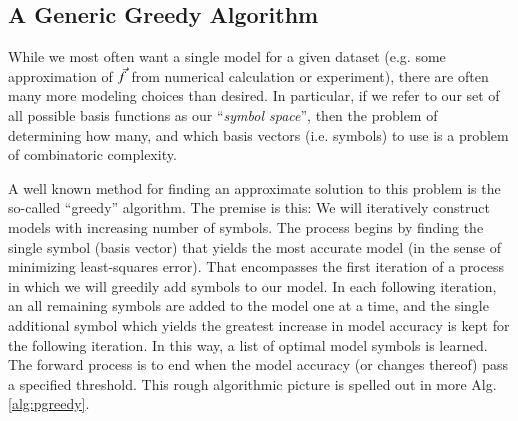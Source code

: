 \documentclass[twocolumn,aps,prd,floatfix,preprintnumbers,a4paper,nofootinbib,
superscriptaddress,10pt]{revtex4-1}
\begin{document}
\subsection{A Generic Greedy Algorithm}
%
While we most often want a single model for a given dataset (e.g. some approximation of $\vec{f}$ from numerical calculation or experiment), there are often many more modeling choices than desired.
%
In particular, if we refer to our set of all possible basis functions as our ``\textit{symbol space}'', then the problem of determining how many, and which basis vectors (i.e. symbols) to use is a problem of combinatoric complexity.
%
\par A well known method for finding an approximate solution to this problem is the so-called ``greedy'' algorithm.
%
The premise is this:
%
We will iteratively construct models with increasing number of symbols.
%
The process begins by finding the single symbol (basis vector) that yields the most accurate model (in the sense of minimizing least-squares error).
%
That encompasses the first iteration of a process in which we will greedily add symbols to our model.
%
In each following iteration, an all remaining symbols are added to the model one at a time, and the single additional symbol which yields the greatest increase in model accuracy is kept for the following iteration.
%
In this way, a list of optimal model symbols is learned.
%
The forward process is to end when the model accuracy (or changes thereof) pass a specified threshold.
%
This rough algorithmic picture is spelled out in more Alg. \ref{alg:pgreedy}.
%
%
\hspace{1cm}
\end{document}
